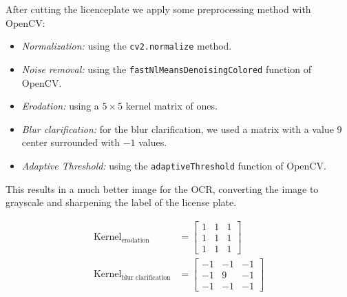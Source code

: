 After cutting the licenceplate we apply some preprocessing method with OpenCV:
\begin{itemize}
    \item \emph{Normalization:} using the \texttt{cv2.normalize} method.
    \item \emph{Noise removal:} using the
        \texttt{fastNlMeansDenoisingColored} function of OpenCV.
    \item \emph{Erodation:} using a $5 \times 5$ kernel matrix of ones.
    \item \emph{Blur clarification:} for the blur clarification, we used a matrix
        with a value $9$ center surrounded with $-1$ values.
    \item \emph{Adaptive Threshold:} using the \texttt{adaptiveThreshold}
        function of OpenCV. 
\end{itemize}

This results in a much better image for the OCR, converting the image to
grayscale and sharpening the label of the license plate. 

\begin{align*}
    \text{Kernel}_{\text{erodation}}&= 
    \begin{bmatrix}
        1 & 1 & 1\\
        1 & 1 & 1 \\
        1 & 1 & 1
    \end{bmatrix}\\
    \text{Kernel}_{\text{blur clarification}}&= 
    \begin{bmatrix}
        -1 & -1 & -1\\
        -1 & 9  & -1 \\
        -1 & -1 & -1
    \end{bmatrix}
\end{align*}

